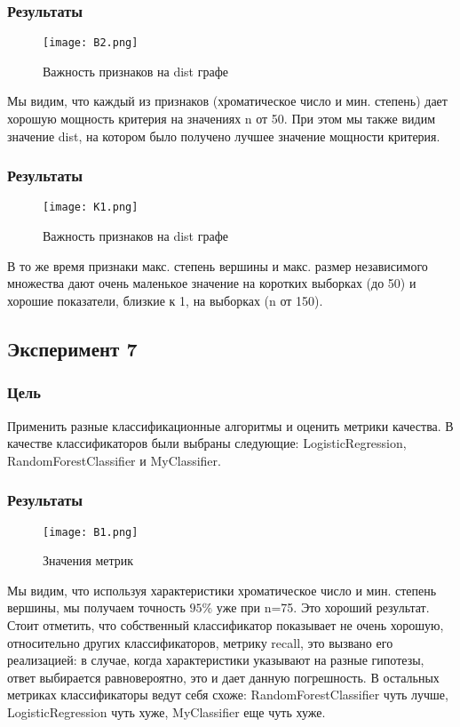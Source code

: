 \documentclass[a4paper, 12pt]{article}
\begin{document}
\subsubsection{Результаты}
\begin{figure}[H]
    \centering
    \texttt{[image: В2.png]}
    \caption{Важность признаков на dist графе}
    \label{fig:uml}
\end{figure}
Мы видим, что каждый из признаков (хроматическое число и мин. степень) дает хорошую мощность критерия на значениях n от 50. При этом мы также видим значение dist, на котором было получено лучшее значение мощности критерия. 

\subsubsection{Результаты}
\begin{figure}[H]
    \centering
    \texttt{[image: К1.png]}
    \caption{Важность признаков на dist графе}
    \label{fig:uml}
\end{figure}

В то же время признаки макс. степень вершины и макс. размер независимого множества дают очень маленькое значение на коротких выборках (до 50) и хорошие показатели, близкие к 1, на выборках (n от 150).

\subsection{Эксперимент 7}
\subsubsection{Цель}
Применить разные классификационные алгоритмы и оценить метрики качества.
В качестве классификаторов были выбраны следующие: LogisticRegression, RandomForestClassifier и MyClassifier.\\
\subsubsection{Результаты}
\begin{figure}[H]
    \centering
    \texttt{[image: В1.png]}
    \caption{Значения метрик}
    \label{fig:uml}
\end{figure}


Мы видим, что используя характеристики хроматическое число и мин. степень вершины, мы получаем точность $95\%$ уже при n=75. Это хороший результат. Стоит отметить, что собственный классификатор показывает не очень хорошую, относительно других классификаторов, метрику recall, это вызвано его реализацией: в случае, когда характеристики указывают на разные гипотезы, ответ выбирается равновероятно, это и дает данную погрешность. В остальных метриках классификаторы ведут себя схоже: RandomForestClassifier чуть лучше, LogisticRegression чуть хуже, MyClassifier еще чуть хуже.  
\end{document}
